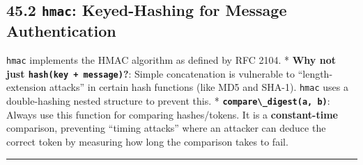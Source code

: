 \hypertarget{hmac-keyed-hashing-for-message-authentication}{%
\subsection{\texorpdfstring{45.2 \texttt{hmac}: Keyed-Hashing for
Message
Authentication}{45.2 hmac: Keyed-Hashing for Message Authentication}}\label{hmac-keyed-hashing-for-message-authentication}}

\passthrough{\lstinline!hmac!} implements the HMAC algorithm as defined
by RFC 2104. * \textbf{Why not just
\passthrough{\lstinline!hash(key + message)!}?}: Simple concatenation is
vulnerable to ``length-extension attacks'' in certain hash functions
(like MD5 and SHA-1). \passthrough{\lstinline!hmac!} uses a
double-hashing nested structure to prevent this. *
\textbf{\passthrough{\lstinline!compare\_digest(a, b)!}}: Always use
this function for comparing hashes/tokens. It is a
\textbf{constant-time} comparison, preventing ``timing attacks'' where
an attacker can deduce the correct token by measuring how long the
comparison takes to fail.

\begin{center}\rule{0.5\linewidth}{0.5pt}\end{center}
